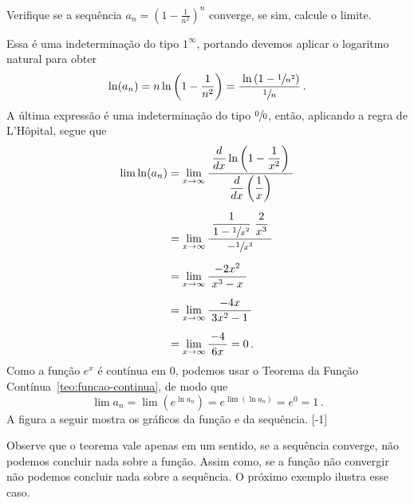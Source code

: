 \begin{example}
    Verifique se a sequência
    \(
      a_n = \left( 1-\frac{1}{n^2}\right)^n
    \)
    converge, se sim, calcule o limite.

    \solution
    Essa é uma indeterminação do tipo $1^\infty$,
    portando devemos aplicar o logaritmo natural para obter
    \[
      \ln(a_n) = n\ln\left( 1-\frac{1}{n^2}\right)
              = \frac{\;\ln \left( 1-\sfrac{1}{n^2}\right) }{\sfrac{1}{n}}   \,.
    \]
    A última expressão é uma indeterminação do tipo $\sfrac{0}{0}$,
    então, aplicando a regra de L'Hôpital, segue que
    \begin{align*}
      \lim \ln(a_n)
        & = \lim_{x\to\infty}\dfrac{\;\dfrac{d}{dx}\ln\left(1-\dfrac{1}{x^2}\right)\;}
                                   {  \dfrac{d}{dx}\left(\dfrac{1}{x}\right)}  \\[2mm]
        & = \lim_{x\to\infty}\dfrac{\;\dfrac{1}{1-\sfrac{1}{x^2}}\;\dfrac{2}{x^3}\;}{-\sfrac{1}{x^2}} \\[2mm]
        & = \lim_{x\to\infty}\frac{-2x^2}{\;x^3-x\;}                                                  \\[2mm]
        & = \lim_{x\to\infty}\frac{-4x}{\;3x^2-1\;}                                                   \\[2mm]
        & = \lim_{x\to\infty}\frac{-4}{\;6x\;}
          = 0    \,.
    \end{align*}
    Como a função $e^x$ é contínua em $0$, podemos usar o
    Teorema da Função Contínua~\ref{teo:funcao-continua},
    de modo que
    \[
      \lim a_n = \lim\left( e^{\ln a_n} \right)
               = e^{\lim\left( \ln a_n \right)}
               = e^0
               = 1    \,.
    \]
    A figura a seguir mostra os gráficos da função e da sequência.
    [-1]
\end{example}

Observe que o teorema vale apenas em um sentido, se a sequência converge,
não podemos concluir nada sobre a função.
Assim como, se a função não convergir não podemos concluir nada sobre a sequência.
O próximo exemplo ilustra esse caso.

